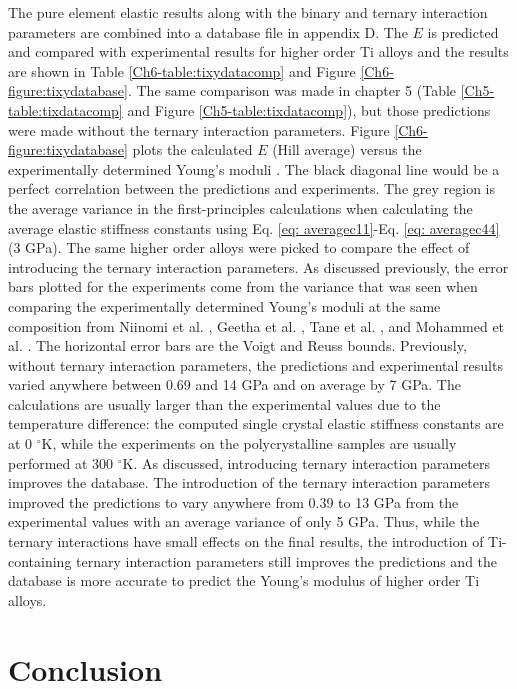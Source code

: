 The pure element elastic results along with the binary and ternary interaction parameters are combined into a database file in appendix D. The $E$ is predicted and compared with experimental results for higher order Ti alloys and the results are shown in Table \ref{Ch6-table:tixydatacomp} and Figure \ref{Ch6-figure:tixydatabase}. The same comparison was made in chapter 5 (Table \ref{Ch5-table:tixdatacomp} and Figure \ref{Ch5-table:tixdatacomp}), but those predictions were made without the ternary interaction parameters. Figure \ref{Ch6-figure:tixydatabase} plots the calculated $E$ (Hill average) versus the experimentally determined Young's moduli \cite{Tane2010a,Mohammed2014,Geetha2009}. The black diagonal line would be a perfect correlation between the predictions and experiments. The grey region is the average variance in the first-principles calculations when calculating the average elastic stiffness constants using Eq. \ref{eq: averagec11}-Eq. \ref{eq: averagec44} (3 GPa). The same higher order alloys were picked to compare the effect of introducing the ternary interaction parameters. As discussed previously, the error bars plotted for the experiments come from the variance that was seen when comparing the experimentally determined Young's moduli at the same composition from Niinomi et al. \cite{Niinomi2012}, Geetha et al. \cite{Geetha2009}, Tane et al. \cite{Tane2010a}, and Mohammed et al. \cite{Mohammed2014}. The horizontal error bars are the Voigt and Reuss bounds. Previously, without ternary interaction parameters, the predictions and experimental results varied anywhere between 0.69 and 14 GPa and on average by 7 GPa. The calculations are usually larger than the experimental values due to the temperature difference: the computed single crystal elastic stiffness constants are at 0 $^{\circ}$K, while the experiments on the polycrystalline samples are usually performed at 300 $^{\circ}$K. As discussed, introducing ternary interaction parameters improves the database. The introduction of the ternary interaction parameters improved the predictions to vary anywhere from 0.39 to 13 GPa from the experimental values with an average variance of only 5 GPa. Thus, while the ternary interactions have small effects on the final results, the introduction of Ti-containing ternary interaction parameters still improves the predictions and the database is more accurate to predict the Young's modulus of higher order Ti alloys. 

\section{Conclusion}

